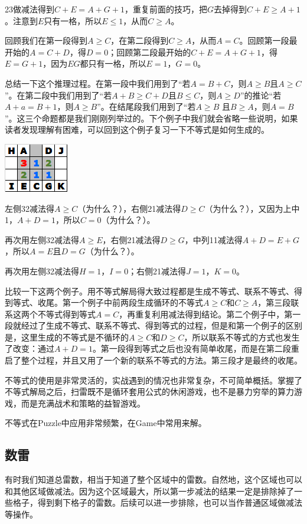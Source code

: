 23做减法得到$C+E=A+G+1$，重复前面的技巧，把$G$去掉得到$C+E\ge A+1$。注意到$E$只有一格，所以$E\le 1$，从而$C\ge A$。

回顾我们在第一段得到$A\ge C$，在第二段得到$C\ge A$，从而$A=C$。回顾第一段最开始的$A=C+D$，得$D=0$；回顾第二段最开始的$C+E=A+G+1$，得$E=G+1$，因为$EG$都只有一格，所以$E=1$，$G=0$。

总结一下这个推理过程。在第一段中我们用到了“若$A=B+C$，则$A\ge B$且$A\ge C$”。在第二段中我们用到了“若$A+B\ge C+D$且$B\le C$，则$A\ge D$”的推论“若$A+a=B+1$，则$A\ge B$”。在结尾段我们用到了“若$A\ge B$ 且$B\ge A$，则$A=B$”。这三个命题都是我们刚刚列举过的。下个例子中我们就会省略一些说明，如果读者发现理解有困难，可以回到这个例子复习一下不等式是如何生成的。

\vspace{5mm}
\begin{center}
    \includegraphics{trick/不等式2.png}
\end{center}
左侧32减法得$A\ge C$（为什么？），右侧21减法得$D\ge C$（为什么？），又因为上中1，$A+D=1$，所以$C=0$（为什么？）。

再次用左侧32减法得$A\ge E$，右侧21减法得$D\ge G$，中列11减法得$A+D=E+G$，所以$A=E$且$D=G$（为什么？）。

再次用左侧32减法得$H=1$，$I=0$；右侧21减法得$J=1$，$K=0$。

\vspace{5mm}比较一下这两个例子。用不等式解局得大致过程都是生成不等式、联系不等式、得到等式、收尾。第一个例子中前两段生成循环的不等式$A\ge C$和$C\ge A$，第三段联系这两个不等式得到等式$A=C$，再重复利用减法得到结论。第二个例子中，第一段就经过了生成不等式、联系不等式、得到等式的过程，但是和第一个例子的区别是，这里生成的不等式是不循环的$A\ge C$和$D\ge C$，所以联系不等式的方式也发生了改变：通过$A+D=1$。第一段得到等式之后也没有简单收尾，而是在第二段重启了整个过程，并且又用了一个新的联系不等式的方法。第三段才是最终的收尾。

不等式的使用是非常灵活的，实战遇到的情况也非常复杂，不可简单概括。掌握了不等式解局之后，扫雷既不是循环套用公式的休闲游戏，也不是暴力穷举的算力游戏，而是充满战术和策略的益智游戏。

不等式在Puzzle中应用非常频繁，在Game中常用来解。

\subsection{数雷}
有时我们知道总雷数，相当于知道了整个区域中的雷数。自然地，这个区域也可以和其他区域做减法。因为这个区域最大，所以第一步减法的结果一定是排除掉了一些格子，得到剩下格子的雷数。后续可以进一步排除，也可以当作普通区域做减法等操作。

